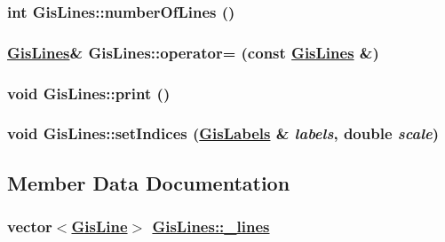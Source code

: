 \hypertarget{classGisLines_a3}{
\subsubsection[numberOfLines]{\setlength{\rightskip}{0pt plus 5cm}int Gis\-Lines::number\-Of\-Lines ()}}
\label{classGisLines_a3}


\hypertarget{classGisLines_d1}{
\subsubsection[operator=]{\setlength{\rightskip}{0pt plus 5cm}\hyperlink{classGisLines}{Gis\-Lines}\& Gis\-Lines::operator= (const \hyperlink{classGisLines}{Gis\-Lines} \&)}}
\label{classGisLines_d1}


\hypertarget{classGisLines_a10}{
\subsubsection[print]{\setlength{\rightskip}{0pt plus 5cm}void Gis\-Lines::print ()}}
\label{classGisLines_a10}


\hypertarget{classGisLines_a9}{
\subsubsection[setIndices]{\setlength{\rightskip}{0pt plus 5cm}void Gis\-Lines::set\-Indices (\hyperlink{classGisLabels}{Gis\-Labels} \& {\em labels}, double {\em scale})}}
\label{classGisLines_a9}




\subsection{Member Data Documentation}
\hypertarget{classGisLines_p2}{
\subsubsection[\_\-lines]{\setlength{\rightskip}{0pt plus 5cm}vector$<$\hyperlink{classGisLine}{Gis\-Line}$>$ \hyperlink{classGisLines_p2}{Gis\-Lines::\_\-lines}}}
\label{classGisLines_p2}


